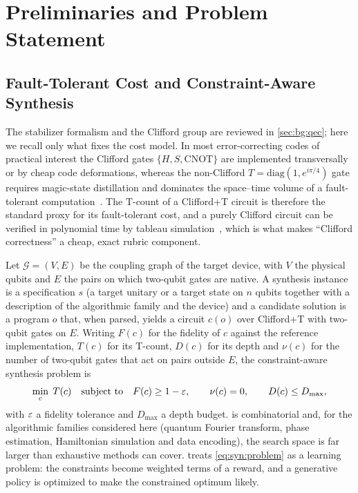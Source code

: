 \section{Preliminaries and Problem Statement}\label{sec:syn:prelim}

\subsection{Fault-Tolerant Cost and Constraint-Aware Synthesis}\label{sec:syn:ftcost}

The stabilizer formalism and the Clifford group are reviewed in \cref{sec:bg:qec}; here we recall only what fixes the cost model. In most error-correcting codes of practical interest the Clifford gates $\{H, S, \mathrm{CNOT}\}$ are implemented transversally or by cheap code deformations, whereas the non-Clifford $T=\mathrm{diag}(1,e^{i\pi/4})$ gate requires magic-state distillation and dominates the space--time volume of a fault-tolerant computation~\cite{bravyi2005magic,fowler2012surfacecodes}. The T-count of a Clifford+T circuit is therefore the standard proxy for its fault-tolerant cost, and a purely Clifford circuit can be verified in polynomial time by tableau simulation~\cite{gottesman1997stabilizer,aaronson2004stabilizer}, which is what makes ``Clifford correctness'' a cheap, exact rubric component.

Let $\mathcal{G}=(V,E)$ be the coupling graph of the target device, with $V$ the physical qubits and $E$ the pairs on which two-qubit gates are native. A synthesis instance is a specification $s$ (a target unitary or a target state on $n$ qubits together with a description of the algorithmic family and the device) and a candidate solution is a program $o$ that, when parsed, yields a circuit $c(o)$ over Clifford+T with two-qubit gates on $E$. Writing $F(c)$ for the fidelity of $c$ against the reference implementation, $T(c)$ for its T-count, $D(c)$ for its depth and $\nu(c)$ for the number of two-qubit gates that act on pairs outside $E$, the constraint-aware synthesis problem is
\begin{equation}\label{eq:syn:problem}
  \min_{c}\; T(c) \quad\text{subject to}\quad F(c)\ge 1-\varepsilon,\qquad \nu(c)=0,\qquad D(c)\le D_{\max},
\end{equation}
with $\varepsilon$ a fidelity tolerance and $D_{\max}$ a depth budget.  is combinatorial and, for the algorithmic families considered here (quantum Fourier transform, phase estimation, Hamiltonian simulation and data encoding), the search space is far larger than exhaustive methods can cover. \rubriq{} treats \cref{eq:syn:problem} as a learning problem: the constraints become weighted terms of a reward, and a generative policy is optimized to make the constrained optimum likely.

